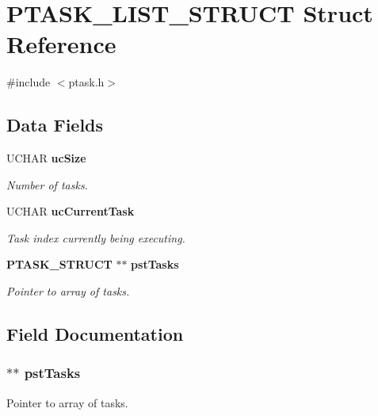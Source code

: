\section{PTASK\_\-LIST\_\-STRUCT Struct Reference}
\label{struct_p_t_a_s_k___l_i_s_t___s_t_r_u_c_t}


{\ttfamily \#include $<$ptask.h$>$}\subsection*{Data Fields}
\begin{DoxyCompactItemize}
\item 
UCHAR {\bf ucSize}
\begin{DoxyCompactList}\small\item\em Number of tasks. \item\end{DoxyCompactList}\item 
UCHAR {\bf ucCurrentTask}
\begin{DoxyCompactList}\small\item\em Task index currently being executing. \item\end{DoxyCompactList}\item 
{\bf PTASK\_\-STRUCT} $\ast$$\ast$ {\bf pstTasks}
\begin{DoxyCompactList}\small\item\em Pointer to array of tasks. \item\end{DoxyCompactList}\end{DoxyCompactItemize}


\subsection{Field Documentation}
\subsubsection[{pstTasks}]{$\ast$$\ast$ {\bf pstTasks}}\label{struct_p_t_a_s_k___l_i_s_t___s_t_r_u_c_t_a62c9f7058ec967ac0d69cd673c6ee2c3}


Pointer to array of tasks. 
